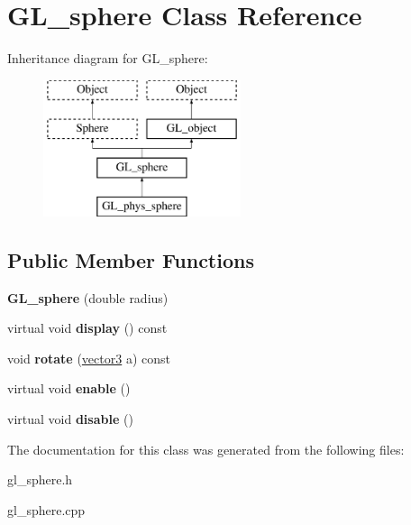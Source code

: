 \hypertarget{class_g_l__sphere}{
\section{GL\_\-sphere Class Reference}
\label{class_g_l__sphere}
}
Inheritance diagram for GL\_\-sphere:\begin{figure}[H]
\begin{center}
\leavevmode
\includegraphics[height=4.000000cm]{class_g_l__sphere}
\end{center}
\end{figure}
\subsection*{Public Member Functions}
\begin{DoxyCompactItemize}
\item 
\hypertarget{class_g_l__sphere_aae0a5b63f758263a8d7933a9d8ea6bf7}{
{\bfseries GL\_\-sphere} (double radius)}
\label{class_g_l__sphere_aae0a5b63f758263a8d7933a9d8ea6bf7}

\item 
\hypertarget{class_g_l__sphere_aefc6b2f1f7c2f1be14701d6bbcdd6898}{
virtual void {\bfseries display} () const }
\label{class_g_l__sphere_aefc6b2f1f7c2f1be14701d6bbcdd6898}

\item 
\hypertarget{class_g_l__sphere_a9ff8d0ac6fb768df3d538a5a07ddd2e8}{
void {\bfseries rotate} (\hyperlink{classvector3d}{vector3} a) const }
\label{class_g_l__sphere_a9ff8d0ac6fb768df3d538a5a07ddd2e8}

\item 
\hypertarget{class_g_l__sphere_a4cc9753e6390813a664133577444cf80}{
virtual void {\bfseries enable} ()}
\label{class_g_l__sphere_a4cc9753e6390813a664133577444cf80}

\item 
\hypertarget{class_g_l__sphere_ab9b3127b96d5e95bef1e9f22c757923a}{
virtual void {\bfseries disable} ()}
\label{class_g_l__sphere_ab9b3127b96d5e95bef1e9f22c757923a}

\end{DoxyCompactItemize}


The documentation for this class was generated from the following files:\begin{DoxyCompactItemize}
\item 
gl\_\-sphere.h\item 
gl\_\-sphere.cpp\end{DoxyCompactItemize}
